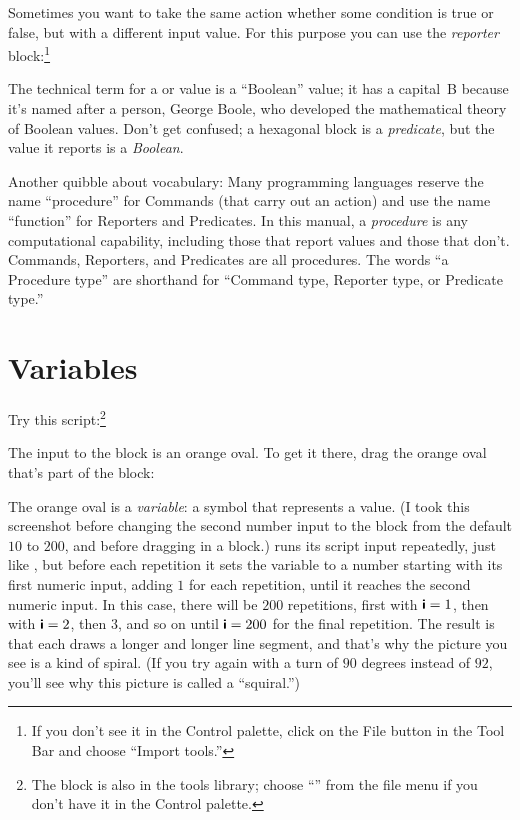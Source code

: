 \documentclass{report}
\begin{document}
Sometimes you want to take the same action whether some condition is true or false, but with a different input value. For this purpose you can use the \emph{reporter}  block:\footnote{\onehalfspacing If you don't see it in the Control palette, click on the File button  in the Tool Bar and choose ``Import tools.''}\nopagebreak


The technical term for a  or  value is a ``Boolean'' value; it has a capital~B because it's named after a person, George Boole, who developed the mathematical theory of Boolean values. Don't get confused; a hexagonal block is a \emph{predicate}, but the value it reports is a \emph{Boolean}.

Another quibble about vocabulary: Many programming languages reserve the name ``procedure'' for Commands (that carry out an action) and use the name ``function'' for Reporters and Predicates. In this manual, a \emph{procedure} is any computational capability, including those that report values and those that don't. Commands, Reporters, and Predicates are all procedures. The words ``a Procedure type'' are shorthand for ``Command type, Reporter type, or Predicate type.''

\section{Variables}

Try this script:\footnote{The  block is also in the tools library; choose ``'' from the file menu if you don't have it in the Control palette.}\nopagebreak


The input to the  block is an orange oval. To get it there, drag the orange oval that's part of the  block:\nopagebreak


The orange oval is a \emph{variable}: a symbol that represents a value. (I took this screenshot before changing the second number input to the  block from the default $10$ to $200$, and before dragging in a  block.)  runs its script input repeatedly, just like , but before each repetition it sets the variable  to a number starting with its first numeric input, adding $1$ for each repetition, until it reaches the second numeric input. In this case, there will be $200$ repetitions, first with $\textsf{\textbf{i}}=1$, then with $\textsf{\textbf{i}}=2$, then $3$, and so on until $\textsf{\textbf{i}}=200$ for the final repetition. The result is that each  draws a longer and longer line segment, and that's why the picture you see is a kind of spiral. (If you try again with a turn of $90$ degrees instead of $92$, you'll see why this picture is called a ``squiral.'')
\end{document}
